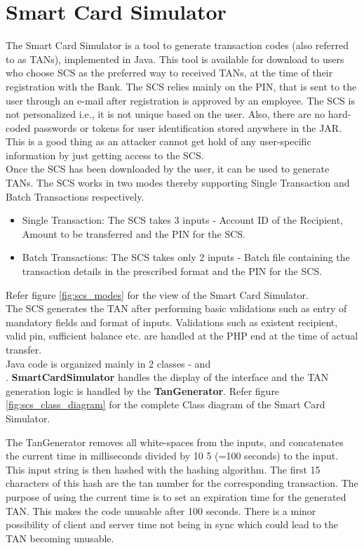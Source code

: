 \section{Smart Card Simulator}

The Smart Card Simulator is a tool to generate transaction codes (also referred to as TANs), implemented in Java. This tool is available for download to users who choose SCS as the preferred way to received TANs, at the time of their registration with the Bank. The SCS relies mainly on the PIN, that is sent to the user through an e-mail after registration is approved by an employee.
The SCS is not personalized i.e., it is not unique based on the user. Also, there
are no hard-coded passwords or tokens for user identification stored anywhere in
the JAR. This is a good thing as an attacker cannot get hold of any user-specific
information by just getting access to the SCS. \\

Once the SCS has been downloaded by the user, it can be used to generate TANs. The SCS works in two modes thereby supporting Single Transaction and Batch Transactions respectively.
\begin{itemize}
\item Single Transaction: The SCS takes 3 inputs - Account ID of the Recipient, Amount to be transferred and the PIN for the SCS. 
\item Batch Transactions: The SCS takes only 2 inputs - Batch file containing the transaction details in the prescribed format and the PIN for the SCS.
\end{itemize}
Refer figure \ref{fig:scs_modes} for the view of the Smart Card Simulator. \\

The SCS generates the TAN after performing basic validations such as entry of mandatory fields and format of inputs. Validations such as existent recipient, valid pin, sufficient balance etc. are handled at the PHP end at the time of actual transfer. \\

Java code is organized mainly in 2 classes -  and \\ . \textbf{SmartCardSimulator} handles the display of the interface and the TAN generation logic is handled by the \textbf{TanGenerator}.
Refer figure \ref{fig:scs_class_diagram} for the complete Class diagram of the Smart Card Simulator.


The TanGenerator removes all white-spaces from the inputs, and concatenates the current time in milliseconds divided by 10 5 (=100 seconds) to the input. This input string is then hashed with the  hashing
algorithm. The first 15 characters of this hash are the tan number for the corresponding transaction.
The purpose of using the current time is to set an expiration time for the generated TAN. This makes the code unusable after 100 seconds. There is a minor possibility of client and server time not being in sync which could lead to the TAN becoming unusable. \\

